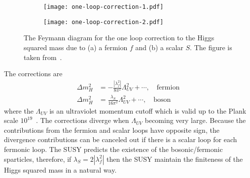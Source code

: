\begin{figure}[htbp]
\begin{center}
\begin{subfigure}[b]{0.48\textwidth}
\begin{center}
\texttt{[image: one-loop-correction-1.pdf]}
\caption{}
\end{center}
\end{subfigure}%
\begin{subfigure}[b]{0.48\textwidth}
\begin{center}
\texttt{[image: one-loop-correction-2.pdf]}
\caption{}
\end{center}
\end{subfigure}
\end{center}
\caption{The Feymann diagram for the one loop correction to the Higgs squared mass due to (a) a fermion $f$ and (b) a scalar $S$.
The figure is taken from~\cite{Martin:1997ns}.
}
\label{fig:susy_one_loop_corrections}
\end{figure}


The corrections are
%
\begin{align}
\Delta m_{H}^{2} &= - \frac{|\lambda_{f}^{2}|}{8\pi^{2}} \Lambda_{UV}^{2} + \cdots, \quad \mathrm{fermion}\\
\Delta m_{H}^{2} &= \frac{\lambda_{S}}{16\pi^{2}} \Lambda_{UV}^{2} + \cdots, \quad \mathrm{boson}
\end{align}
%
where the $\Lambda_{UV}$ is an ultraviolet momentum cutoff which is valid up to the Plank scale $10^{19}$~{\GeV}.
The corrections diverge when $\Lambda_{UV}$ becoming very large.
Because the contributions from the fermion and scalar loops have opposite sign, the divergence contributions can be canceled out if there is a scalar loop for each fermonic loop.
The SUSY predicts the existence of the bosonic/fermonic sparticles, therefore, if $\lambda_{S} = 2 |\lambda_{f}^{2}|$ then the SUSY maintain the finiteness of the Higgs squared mass in a natural way.


